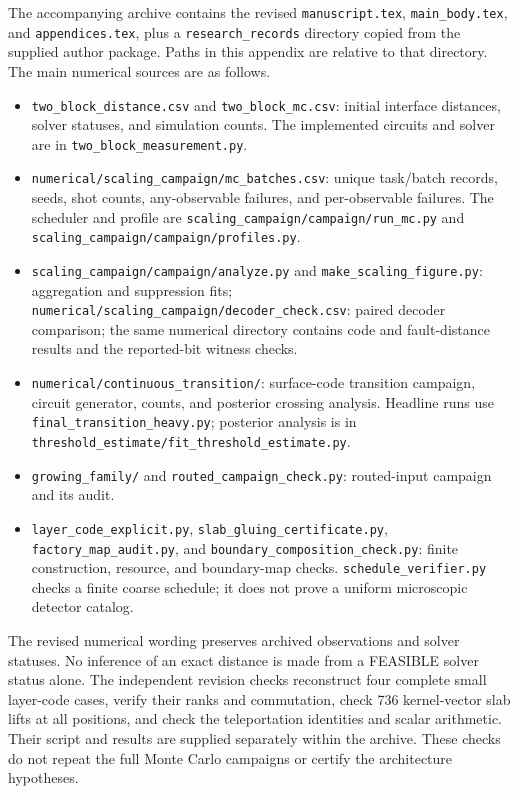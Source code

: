 The accompanying archive contains the revised \nolinkurl{manuscript.tex},
\nolinkurl{main_body.tex}, and \nolinkurl{appendices.tex}, plus a
\nolinkurl{research_records} directory copied from the supplied author
package. Paths in this appendix are relative to that directory.
The main numerical sources are as follows.
\begingroup\raggedright
\begin{itemize}
\item \nolinkurl{two_block_distance.csv} and
\nolinkurl{two_block_mc.csv}: initial interface distances, solver statuses,
and simulation counts. The implemented circuits and solver are in
\nolinkurl{two_block_measurement.py}.
\item \nolinkurl{numerical/scaling_campaign/mc_batches.csv}: unique
task/batch records, seeds, shot counts, any-observable failures, and
per-observable failures. The scheduler and profile are
\nolinkurl{scaling_campaign/campaign/run_mc.py} and
\nolinkurl{scaling_campaign/campaign/profiles.py}.
\item \nolinkurl{scaling_campaign/campaign/analyze.py} and
\nolinkurl{make_scaling_figure.py}: aggregation and suppression fits;
\nolinkurl{numerical/scaling_campaign/decoder_check.csv}: paired decoder
comparison; the same numerical directory contains code and fault-distance
results and the reported-bit witness checks.
\item \nolinkurl{numerical/continuous_transition/}: surface-code
transition campaign, circuit generator, counts, and posterior crossing
analysis. Headline runs use
\nolinkurl{final_transition_heavy.py}; posterior analysis is in
\nolinkurl{threshold_estimate/fit_threshold_estimate.py}.
\item \nolinkurl{growing_family/} and
\nolinkurl{routed_campaign_check.py}: routed-input campaign and its audit.
\item \nolinkurl{layer_code_explicit.py},
\nolinkurl{slab_gluing_certificate.py},
\nolinkurl{factory_map_audit.py}, and
\nolinkurl{boundary_composition_check.py}: finite construction, resource,
and boundary-map checks. \nolinkurl{schedule_verifier.py} checks a finite
coarse schedule; it does not prove a uniform microscopic detector catalog.
\end{itemize}
\endgroup

The revised numerical wording preserves archived observations and solver
statuses. No inference of an exact distance is made from a FEASIBLE
solver status alone. The independent revision checks reconstruct four
complete small layer-code cases, verify their ranks and commutation,
check 736 kernel-vector slab lifts at all positions, and check the
teleportation identities and scalar arithmetic. Their script and results
are supplied separately within the archive. These checks do not repeat
the full Monte Carlo campaigns or certify the architecture hypotheses.


